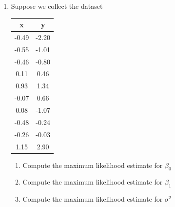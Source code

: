 \begin{enumerate}
    \item Suppose we collect the dataset
    \begin{table}[ht!]
        \centering
        \begin{tabular}{c|c}
            x & y \\
            \hline
            -0.49 &  -2.20\\
            -0.55 &  -1.01\\
            -0.46 &  -0.80\\
             0.11 &  0.46\\
             0.93 &  1.34\\
            -0.07 &  0.66\\
             0.08 &  -1.07\\
            -0.48 &  -0.24\\
            -0.26 &  -0.03\\
             1.15 &  2.90\\
        \end{tabular}
    \end{table}
    \begin{enumerate}
        \item Compute the maximum likelihood estimate for $\beta_{0}$
        \item Compute the maximum likelihood estimate for $\beta_{1}$
        \item Compute the maximum likelihood estimate for $\sigma^{2}$
    \end{enumerate}
    
\end{enumerate}





